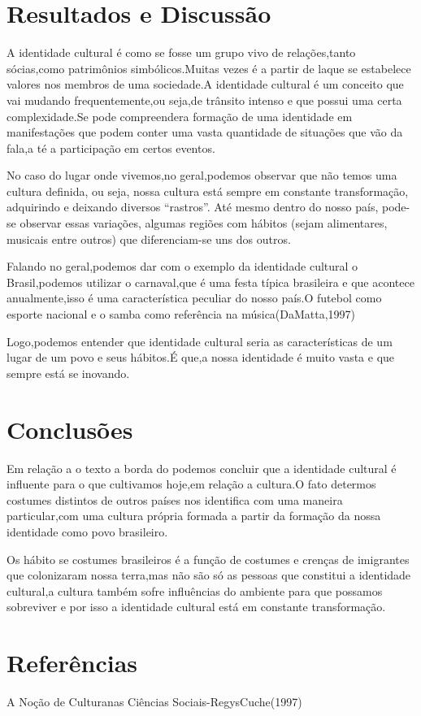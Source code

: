 \documentclass[article,12pt,onesidea,4paper,english,brazil]{abntex2}
\begin{document}
	\section*{Resultados e Discussão}
	
A identidade cultural é como se fosse um grupo vivo de relações,tanto sócias,como patrimônios simbólicos.Muitas vezes é a partir de laque se estabelece valores nos membros de uma sociedade.A identidade cultural é um conceito que vai mudando frequentemente,ou seja,de trânsito intenso e que possui uma certa complexidade.Se pode compreendera formação de uma identidade em manifestações que podem conter uma vasta quantidade de situações que vão da fala,a té a participação em certos eventos.

No caso do lugar onde vivemos,no geral,podemos observar que não temos uma cultura definida, ou seja, nossa cultura está sempre em constante transformação, adquirindo e deixando diversos “rastros”. Até mesmo dentro do nosso país, pode-se observar essas
variações, algumas regiões com hábitos (sejam alimentares, musicais entre outros) que diferenciam-se uns dos outros.

Falando no geral,podemos dar com o exemplo da identidade cultural o Brasil,podemos utilizar o carnaval,que é uma festa típica brasileira e que acontece anualmente,isso é uma característica peculiar do nosso país.O futebol como esporte nacional e o samba como referência na música(DaMatta,1997)

Logo,podemos entender que identidade cultural seria as características de um lugar de um povo e seus hábitos.É que,a nossa identidade é muito vasta e que sempre está se inovando.

	
	\section*{Conclusões}
	
Em relação a o texto a borda do podemos concluir que a identidade cultural é influente para o que cultivamos hoje,em relação a cultura.O fato determos costumes distintos de outros países nos identifica com uma maneira particular,com uma cultura própria formada a partir da formação da nossa identidade como povo brasileiro.

Os hábito se costumes brasileiros é a função de costumes e crenças de imigrantes que colonizaram nossa terra,mas não são só as pessoas que constitui a identidade cultural,a cultura também sofre influências do ambiente para que possamos sobreviver e por isso a identidade cultural está em constante transformação.
	
	\section*{Referências}
	
	\noindent	A Noção de Culturanas Ciências Sociais-RegysCuche(1997)
	
\end{document}
